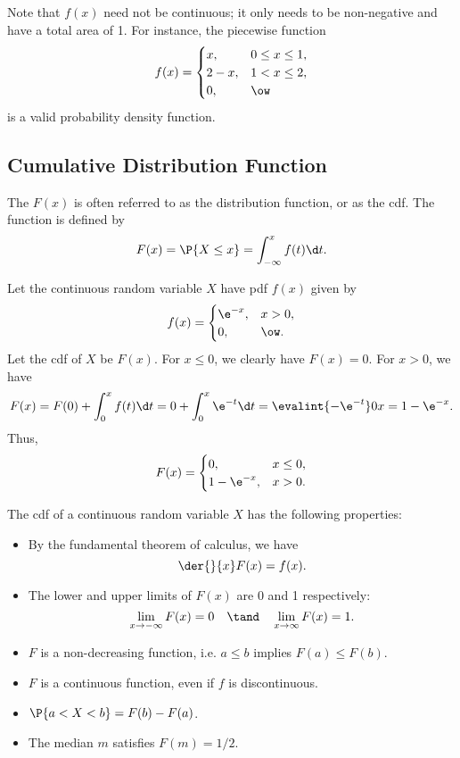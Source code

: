 Note that $f(x)$ need not be continuous; it only needs to be non-negative and have a total area of 1. For instance, the piecewise function \[f(x) = \begin{cases}
    x, & 0 \leq x \leq 1,\\
    2-x, & 1 < x \leq 2,\\
    0, & \ow
\end{cases}\] is a valid probability density function.

\subsection{Cumulative Distribution Function}

\begin{definition}
    The  $F(x)$ is often referred to as the distribution function, or as the cdf. The function is defined by \[F(x) = \P{X \leq x} = \int_{-\infty}^x f(t) \d t.\]
\end{definition}

\begin{example}
    Let the continuous random variable $X$ have pdf $f(x)$ given by \[f(x) = \begin{cases}
        \e^{-x}, & x > 0,\\
        0, & \ow.
    \end{cases}\] Let the cdf of $X$ be $F(x)$. For $x \leq 0$, we clearly have $F(x) = 0$. For $x > 0$, we have \[F(x) = F(0) + \int_0^x f(t) \d t = 0 + \int_0^x \e^{-t} \d t = \evalint{-\e^{-t}}0x = 1 - \e^{-x}.\] Thus, \[F(x) = \begin{cases}
        0, & x \leq 0,\\
        1 - \e^{-x}, & x > 0.
    \end{cases}\]
\end{example}

The cdf of a continuous random variable $X$ has the following properties:

\begin{fact}
    \phantom{.}
    \begin{itemize}
        \item By the fundamental theorem of calculus, we have \[\der{}{x} F(x) = f(x).\]
        \item The lower and upper limits of $F(x)$ are 0 and 1 respectively: \[\lim_{x \to -\infty} F(x) = 0 \quad \tand \quad \lim_{x \to \infty} F(x) = 1.\]
        \item $F$ is a non-decreasing function, i.e. $a \leq b$ implies $F(a) \leq F(b)$.
        \item $F$ is a continuous function, even if $f$ is discontinuous.
        \item $\P{a < X < b} = F(b) - F(a)$.
        \item The median $m$ satisfies $F(m) = 1/2$.
    \end{itemize}
\end{fact}


